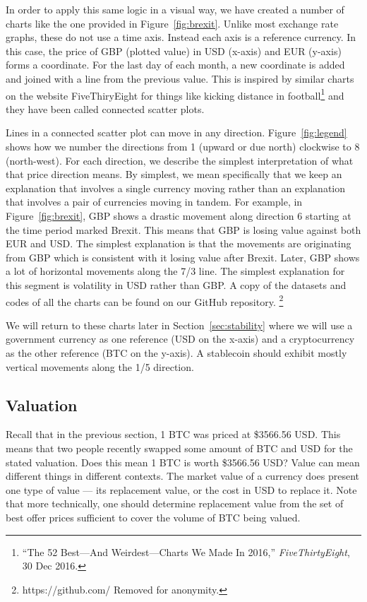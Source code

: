 In order to apply this same logic in a visual way, we have created a number of charts like the one provided in Figure~\ref{fig:brexit}. Unlike most exchange rate graphs, these do not use a time axis. Instead each axis is a reference currency. In this case, the price of GBP (plotted value) in USD (x-axis) and EUR (y-axis) forms a coordinate. For the last day of each month, a new coordinate is added and joined with a line from the previous value. This is inspired by similar charts on the website FiveThiryEight for things like kicking distance in football\footnote{``The 52 Best---And Weirdest---Charts We Made In 2016,'' \textit{FiveThirtyEight}, 30 Dec 2016.} and they have been called connected scatter plots.

Lines in a connected scatter plot can move in any direction. Figure~\ref{fig:legend} shows how we number the directions from 1 (upward or due north) clockwise to 8 (north-west). For each direction, we describe the simplest interpretation of what that price direction means. By simplest, we mean specifically that we keep an explanation that involves a single currency moving rather than an explanation that involves a pair of currencies moving in tandem. For example, in Figure~\ref{fig:brexit}, GBP shows a drastic movement along direction 6 starting at the time period marked Brexit. This means that GBP is losing value against both EUR and USD. The simplest explanation is that the movements are originating from GBP which is consistent with it losing value after Brexit. Later, GBP shows a lot of horizontal movements along the 7/3 line. The simplest explanation for this segment is volatility in USD rather than GBP.
A copy of the datasets and codes of all the charts can be found on our GitHub repository. \footnote{https://github.com/ Removed for anonymity.}


We will return to these charts later in Section~\ref{sec:stability} where we will use a government currency as one reference (USD on the x-axis) and a cryptocurrency as the other reference (BTC on the y-axis). A stablecoin should exhibit mostly vertical movements along the 1/5 direction.

\subsection{Valuation}

Recall that in the previous section, 1 BTC was priced at \$3566.56 USD. This means that two people recently swapped some amount of BTC and USD for the stated valuation. Does this mean 1 BTC is worth \$3566.56 USD? Value can mean different things in different contexts. The market value of a currency does present one type of value --- its replacement value, or the cost in USD to replace it. Note that more technically, one should  determine replacement value from the set of best offer prices sufficient to cover the volume of BTC being valued.

